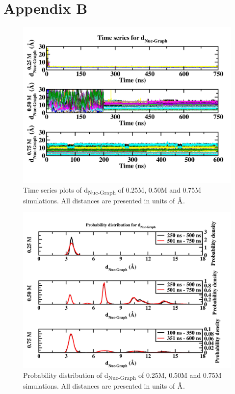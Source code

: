 \chapter{Appendix B}
\setcounter{figure}{0}
\renewcommand{\thefigure}{B.\arabic{figure}}

\begin{figure}
    \centering
    \includegraphics[width=\textwidth]{Appendix/Figures/B1_port.png}
    \caption[Time series plots of d\textsubscript{Nuc-Graph} of 0.25M, 0.50M and 0.75M simulations]{Time series plots of d\textsubscript{Nuc-Graph} of 0.25M, 0.50M and 0.75M simulations. All distances are presented in units of $\text{\normalfont\AA}$.}
\end{figure}

\begin{figure}
    \centering
    \includegraphics[width=\textwidth]{Appendix/Figures/B2_port.png}
    \caption[Probability distribution of d\textsubscript{Nuc-Graph} of 0.25M, 0.50M and 0.75M simulations]{Probability distribution of d\textsubscript{Nuc-Graph} of 0.25M, 0.50M and 0.75M simulations. All distances are presented in units of $\text{\normalfont\AA}$.}
\end{figure}

